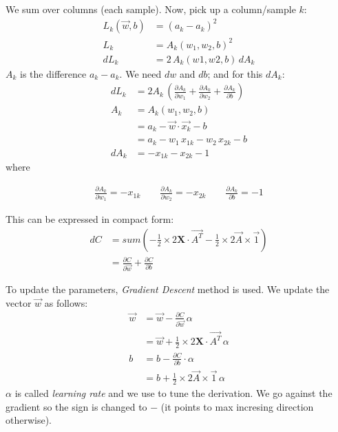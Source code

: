 We sum over columns (each sample). Now, pick up a column/sample $k$:
\begin{align*}
  L_k(\vec{w},b) &= (a_k - \hat{a}_k)^2\\
    L_k &= A_k(w_1, w_2, b)^2\\
    dL_k &= 2\,A_k(w1,w2,b)\,dA_k
\end{align*}
$A_k$ is the difference $a_k-\hat{a}_k$. We need $dw$ and $db$; and for this $dA_k$:
\begin{align*}
  dL_k  &= 2A_k\,(\frac{\partial A_k}{\partial w_1} + \frac{\partial A_k}{\partial w_2} + \frac{\partial A_k}{\partial b}) \\
  A_k &= A_k(w_1, w_2, b)\\
  &= a_k - \vec{w}\cdot{}\vec{x_k} - b\\
  &= a_k - w_1\,x_{1k} - w_2\,x_{2k}-b\\
  dA_k &= -x_{1k} - x_{2k} -1
\end{align*}
where 
\begin{center}
\begin{align*}
  \frac{\partial A_{k}}{\partial w_1} = -x_{1k}\hspace{2em} \frac{\partial A_{k}}{\partial w_2} = -x_{2k}\hspace{2em} \frac{\partial A_k}{\partial b} = -1
\end{align*} 
\end{center}

This can be expressed in compact form:
\begin{align*}
  dC &= sum(-\frac{1}{2}\times{}2\mathbf{X}\cdot{}\vec{A^T}-\frac{1}{2}\times{}2\vec{A}\times{}\vec{1})\\
  &= \frac{\partial C}{\partial \vec{w}} + \frac{\partial C}{\partial b} 
\end{align*}

To update the parameters, \textit{Gradient Descent} method is used. We update the vector $\vec{w}$ as follows:
\begin{align}
  \vec{w} &= \vec{w} -\frac{\partial C}{\partial \vec{w}}\,\alpha\nonumber\\
  &= \vec{w} +\frac{1}{2}\times{}2\mathbf{X}\cdot{}\vec{A^T}\,\alpha\\ 
  b &= b -\frac{\partial C}{\partial b}\cdot{}\alpha\nonumber\\
  &= b +\frac{1}{2}\times{}2\vec{A}\times{}\vec{1}\,\alpha
\end{align}
$\alpha$ is called \textit{learning rate} and we use to tune the derivation. We go against the gradient so the sign is changed to $-$ (it points to max incresing direction otherwise).

